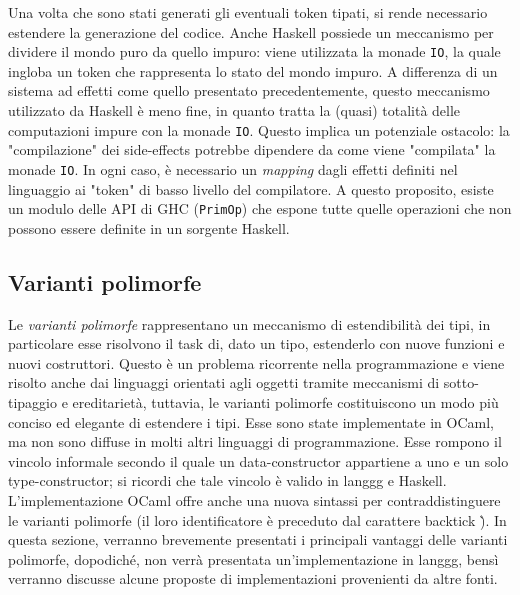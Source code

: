 \documentclass[10pt,a4paper]{article}
\begin{document}
Una volta che sono stati generati gli eventuali token tipati, si rende necessario estendere la generazione del codice.
Anche Haskell possiede un meccanismo per dividere il mondo puro da quello impuro: viene utilizzata la monade \texttt{IO},
la quale ingloba un token che rappresenta lo stato del mondo impuro. A differenza di un sistema ad effetti come quello
presentato precedentemente, questo meccanismo utilizzato da Haskell è meno fine, in quanto tratta la (quasi) totalità
delle computazioni impure con la monade \texttt{IO}. Questo implica un potenziale ostacolo: la "compilazione" dei
side-effects potrebbe dipendere da come viene "compilata" la monade \texttt{IO}. In ogni caso, è necessario un
\textit{mapping}
dagli effetti definiti nel linguaggio ai "token" di basso livello del compilatore. A questo proposito, esiste un
modulo delle API di GHC (\texttt{PrimOp}) che espone tutte quelle operazioni che non possono essere definite in un
sorgente Haskell.

\subsection{Varianti polimorfe}
Le \textit{varianti polimorfe} rappresentano un meccanismo di estendibilità dei tipi, in particolare esse risolvono
il task di, dato un tipo, estenderlo con nuove funzioni e nuovi costruttori. Questo è un problema ricorrente nella
programmazione e viene risolto anche dai linguaggi orientati agli oggetti tramite meccanismi di sotto-tipaggio e
ereditarietà, tuttavia, le varianti polimorfe costituiscono un modo più conciso ed elegante di estendere i tipi.
Esse sono state implementate in OCaml, ma non sono diffuse in molti altri linguaggi di programmazione. Esse rompono
il vincolo informale secondo il quale un data-constructor appartiene a uno e un solo type-constructor; si ricordi che
tale vincolo è valido in langgg e Haskell. L'implementazione OCaml offre anche una nuova sintassi per contraddistinguere
le varianti polimorfe (il loro identificatore è preceduto dal carattere backtick \`).
In questa sezione, verranno brevemente presentati i principali vantaggi delle varianti polimorfe, dopodiché, non verrà
presentata un'implementazione in langgg, bensì verranno discusse alcune proposte di implementazioni provenienti da
altre fonti.
\end{document}

